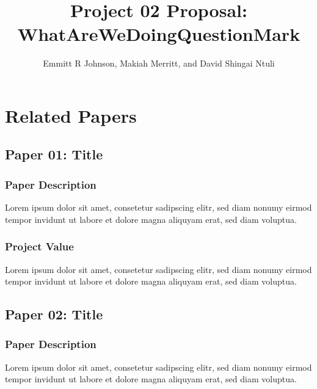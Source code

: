 \documentclass[journal]{vgtc}                %
\title{Project 02 Proposal: WhatAreWeDoingQuestionMark}
\author{Emmitt R Johnson, Makiah Merritt, and David Shingai Ntuli}
\begin{document}


\maketitle


\section{Related Papers}
    \subsection{Paper 01: Title}
        \subsubsection{Paper Description}
        Lorem ipsum dolor sit amet, consetetur sadipscing elitr, sed diam nonumy eirmod tempor invidunt ut labore et dolore magna aliquyam erat, sed diam voluptua.
        \subsubsection{Project Value}
        Lorem ipsum dolor sit amet, consetetur sadipscing elitr, sed diam nonumy eirmod tempor invidunt ut labore et dolore magna aliquyam erat, sed diam voluptua.

    \subsection{Paper 02: Title}
        \subsubsection{Paper Description}
        Lorem ipsum dolor sit amet, consetetur sadipscing elitr, sed diam nonumy eirmod tempor invidunt ut labore et dolore magna aliquyam erat, sed diam voluptua.
\end{document}
